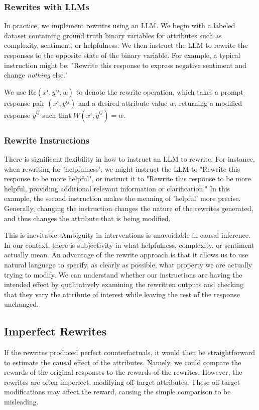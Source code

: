 \documentclass{article}
\theoremstyle{definition}
\begin{document}
\subsubsection{Rewrites with LLMs} 
In practice, we implement rewrites using an LLM. We begin with a labeled dataset containing ground truth binary variables for attributes such as complexity, sentiment, or helpfulness. We then instruct the LLM to rewrite the responses to the opposite state of the binary variable. For example, a typical instruction might be: "Rewrite this response to express negative sentiment and change \emph{nothing} else."

We use $\text{Re}(x^i, y^{ij}, w)$ to denote the rewrite operation, which takes a prompt-response pair $(x^i, y^{ij})$ and a desired attribute value $w$, returning a modified response $\tilde{y}^{ij}$ such that $W(x^i, \tilde{y}^{ij}) = w$.

\subsubsection{Rewrite Instructions}
There is significant flexibility in how to instruct an LLM to rewrite. For instance, when rewriting for 'helpfulness', we might instruct the LLM to "Rewrite this response to be more helpful", or instruct it to "Rewrite this response to be more helpful, providing additional relevant information or clarification." In this example, the second instruction makes the meaning of 'helpful' more precise. Generally, changing the instruction changes the nature of the rewrites generated, and thus changes the attribute that is being modified.

This is inevitable. Ambiguity in interventions is unavoidable in causal inference. In our context, there is subjectivity in what helpfulness, complexity, or sentiment actually mean. An advantage of the rewrite approach is that it allows us to use natural language to specify, as clearly as possible, what property we are actually trying to modify. We can understand whether our instructions are having the intended effect by qualitatively examining the rewritten outputs and checking that they vary the attribute of interest while leaving the rest of the response unchanged.

\subsection{Imperfect Rewrites}
If the rewrites produced perfect counterfactuals, it would then be straightforward to estimate the causal effect of the attributes. Namely, we could compare the rewards of the original responses to the rewards of the rewrites. However, the rewrites are often imperfect, modifying off-target attributes. These off-target modifications may affect the reward, causing the simple comparison to be misleading.
\end{document}
